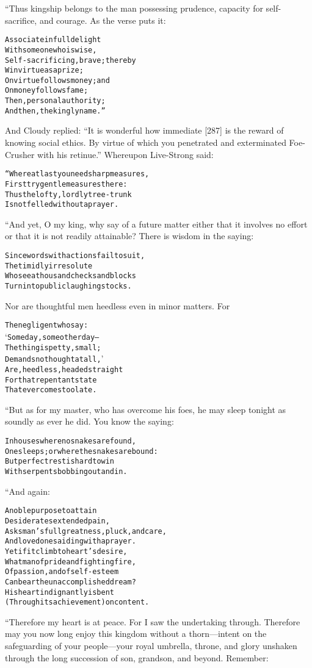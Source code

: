 \documentclass{article}
\renewenvironment{verbatim}{\begin{alltt}\normalfont\begin{centering}}{\end{centering}\end{alltt}}
\begin{document}
“Thus kingship belongs to the man possessing prudence, capacity for
self-sacrifice, and courage. As the verse puts it:

\begin{verbatim}
Associate in full delight
    With someone who is wise,
Self-sacrificing, brave; thereby
    Win virtue as a prize;
On virtue follows money; and
    On money follows fame;
Then, personal authority;
    And then, the kingly name.”
\end{verbatim}
And Cloudy replied:
``It is wonderful how immediate [287] is the reward of knowing social ethics. By virtue of which you penetrated and exterminated Foe-Crusher with his retinue.''
Whereupon Live-Strong said:

\begin{verbatim}
“Where at last you need sharp measures,
    First try gentle measures there:
Thus the lofty, lordly tree-trunk
    Is not felled without a prayer.
\end{verbatim}
“And yet, O my king, why say of a future matter either that it
involves no effort or that it is not readily attainable? There is
wisdom in the saying:

\begin{verbatim}
Since words with actions fail to suit,
The timidly irresolute
Who see a thousand checks and blocks
Turn into public laughingstocks.
\end{verbatim}
Nor are thoughtful men heedless even in minor matters. For

\begin{verbatim}
The negligent who say:
‘Some day, some other day--
The thing is petty, small;
Demands no thought at all,’
Are, heedless, headed straight
For that repentant state
That ever comes too late.
\end{verbatim}
“But as for my master, who has overcome his foes, he may sleep
tonight as soundly as ever he did. You know the saying:

\begin{verbatim}
In houses where no snakes are found,
One sleeps; or where the snakes are bound:
But perfect rest is hard to win
With serpents bobbing out and in.
\end{verbatim}
“And again:

\begin{verbatim}
A noble purpose to attain
Desiderates extended pain,
Asks man's full greatness, pluck, and care,
And loved ones aiding with a prayer.
Yet if it climb to heart's desire,
What man of pride and fighting fire,
Of passion, and of self-esteem
Can bear the unaccomplished dream?
His heart indignantly is bent
(Through its achievement) on content.
\end{verbatim}
“Therefore my heart is at peace. For I saw the undertaking through.
Therefore may you now long enjoy this kingdom without a
thorn---intent on the safeguarding of your people---your royal
umbrella, throne, and glory unshaken through the long succession of
son, grandson, and beyond. Remember:
\end{document}
